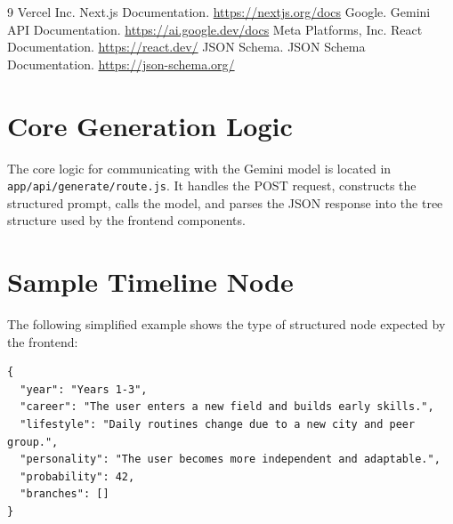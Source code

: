 \documentclass[12pt,a4paper]{report}
\begin{document}
\begin{thebibliography}{9}
Vercel Inc. Next.js Documentation. \url{https://nextjs.org/docs}
Google. Gemini API Documentation. \url{https://ai.google.dev/docs}
Meta Platforms, Inc. React Documentation. \url{https://react.dev/}
JSON Schema. JSON Schema Documentation. \url{https://json-schema.org/}
\end{thebibliography}

\appendix
\chapter{Core Generation Logic}
The core logic for communicating with the Gemini model is located in \texttt{app/api/generate/route.js}. It handles the POST request, constructs the structured prompt, calls the model, and parses the JSON response into the tree structure used by the frontend components.

\chapter{Sample Timeline Node}
The following simplified example shows the type of structured node expected by the frontend:

\begin{verbatim}
{
  "year": "Years 1-3",
  "career": "The user enters a new field and builds early skills.",
  "lifestyle": "Daily routines change due to a new city and peer group.",
  "personality": "The user becomes more independent and adaptable.",
  "probability": 42,
  "branches": []
}
\end{verbatim}
\end{document}
